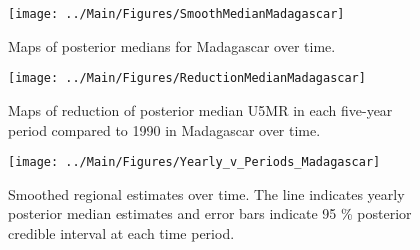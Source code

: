 \documentclass[12pt]{article}\usepackage[]{graphicx}\usepackage[]{color}
\newenvironment{knitrout}{}{} %
\begin{document}
\begin{knitrout}
\color{fgcolor}\begin{figure}[bht]

{\centering \texttt{[image: ../Main/Figures/SmoothMedianMadagascar]} 

}

\caption[Maps of posterior medians for Madagascar  over time]{Maps of posterior medians for Madagascar  over time.}\label{fig:unnamed-chunk-194}
\end{figure}


\end{knitrout}
\begin{knitrout}
\color{fgcolor}\begin{figure}[bht]

{\centering \texttt{[image: ../Main/Figures/ReductionMedianMadagascar]} 

}

\caption[Maps of reduction of posterior median U5MR in each five-year period compared to 1990 in Madagascar over time]{Maps of reduction of posterior median U5MR in each five-year period compared to 1990 in Madagascar over time.}\label{fig:unnamed-chunk-195}
\end{figure}


\end{knitrout}
\begin{knitrout}
\color{fgcolor}\begin{figure}[bht]

{\centering \texttt{[image: ../Main/Figures/Yearly\_v\_Periods\_Madagascar]} 

}

\caption[Smoothed regional estimates over time]{Smoothed regional estimates over time. The line indicates yearly posterior median estimates and error bars indicate 95 \% posterior credible interval at each time period.}\label{fig:unnamed-chunk-196}
\end{figure}


\end{knitrout}
\end{document}

